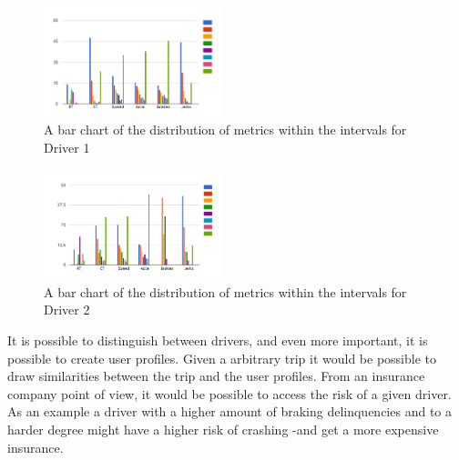 \begin{figure}[tb]
\centering
\includegraphics[width=0.465\textwidth]{Pictures/car8intervals}
\caption{A bar chart of the distribution of metrics within the intervals for Driver 1}
\label{fig:car8intervals}
\end{figure}

\begin{figure}[tb]
\centering
\includegraphics[width=0.465\textwidth]{Pictures/car21intervals}
\caption{A bar chart of the distribution of metrics within the intervals for Driver 2}
\label{fig:car21intervals}
\end{figure}

It is possible to distinguish between drivers, and even more important, it is possible to create user profiles. Given a arbitrary trip it would be possible to draw similarities between the trip and the user profiles. From an insurance company point of view, it would be possible to access the risk of a given driver. As an example a driver with a higher amount of braking delinquencies and to a harder degree might have a higher risk of crashing -and get a more expensive insurance.